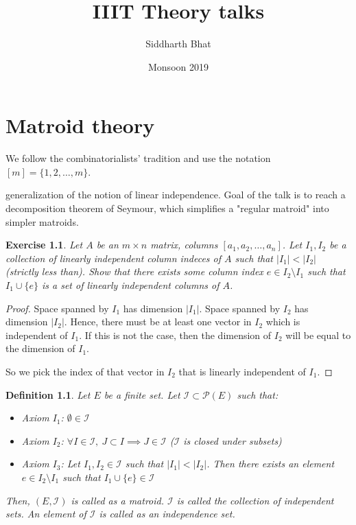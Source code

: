 \documentclass[11pt]{book}
\title{IIIT Theory talks}
\author{Siddharth Bhat}
\date{Monsoon 2019}
\newcommand{\I}{\ensuremath{\mathcal{I}} }
\newcommand{\powerset}{\mathcal{P}}
\newtheorem{definition}{Definition}
\newtheorem{proof}{Proof}
\newtheorem{exercise}{Exercise}
\begin{document}
\maketitle
\tableofcontents

\chapter{Matroid theory}

We follow the combinatorialists' tradition and use  the notation 
${[m] = \{ 1, 2, \dots, m \}}$.

generalization of the notion of linear independence. Goal of the talk is to 
reach a decomposition theorem of Seymour, which simplifies a "regular matroid"
into simpler matroids.

\begin{exercise}
Let $A$ be an $m \times n$ matrix, columns $[a_1, a_2, \dots, a_n]$.
Let $I_1, I_2$ be a collection of linearly independent column indeces of $A$ such
that $|I_1| < |I_2|$ (\textit{strictly} less than). Show that there exists some column index ${e \in I_2 \setminus I_1}$
such that ${I_1 \cup \{e \}}$ is a set of linearly independent columns of $A$.
\end{exercise}
\begin{proof}
    Space spanned by $I_1$ has dimension $|I_1|$. Space spanned by $I_2$
    has dimension $|I_2|$. Hence, there must be at least one vector in $I_2$
    which is independent of $I_1$. If this is not the case, then the dimension of $I_2$
    will be equal to the dimension of $I_1$.

    So we pick the index of that vector in $I_2$ that is linearly independent of $I_1$.
\end{proof}

\begin{definition}
    Let $E$ be a finite set. Let $\I \subset \powerset(E)$ such that:
    \begin{itemize}
        \item Axiom $I_1$: $\emptyset \in \I$
        \item  Axiom $I_2$: $\forall I \in \I, ~ J \subset I \implies J \in \I$ (\I is closed under subsets)
        \item Axiom $I_3$: Let $I_1, I_2 \in \I$ such that $|I_1| < |I_2|$. Then there
            exists an element $e \in I_2 \setminus I_1$ such that $I_1 \cup \{ e \} \in \I$
    \end{itemize}
    Then, $(E, \I)$ is called as a matroid. \I is called the collection of independent sets. An
    element of \I is called as an independence set.
\end{definition}
\end{document}
